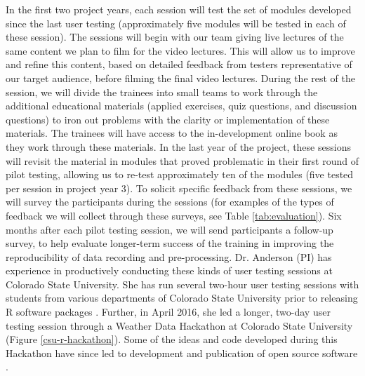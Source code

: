 \documentclass[pdftex,english,11.5pt,parskip=half]{scrartcl}
\begin{document}
In the first two project years, each session will test the set of modules
developed since the last user testing (approximately five modules will be tested
in each of these session). The sessions will begin with our team giving live
lectures of the same content we plan to film for the video lectures. This will allow us to improve and refine this content, based on
detailed feedback from testers representative of our target audience, before
filming the final video lectures. During the rest of the session, we will divide
the trainees into small teams to work through the additional educational
materials (applied exercises, quiz questions, and discussion questions) to iron
out problems with the clarity or implementation of these materials. The trainees
will have access to the in-development online book as they work through these
materials. In the last year of the project, these sessions will revisit the material
in modules that proved problematic in their first round of pilot testing, allowing us
to re-test approximately ten of the modules (five tested per session in project year 3).
To solicit specific feedback from these sessions, we will survey the participants during the sessions (for examples of the types of feedback we will collect through these surveys, see Table \ref*{tab:evaluation}). Six months after each pilot testing session, we will send participants a follow-up survey, to help evaluate longer-term success of the training in improving the reproducibility of data recording and pre-processing. Dr. Anderson (PI) has experience in productively conducting these kinds of user
testing sessions at Colorado State University. She has run several two-hour user testing sessions with
students from various departments of Colorado State University prior to
releasing R software packages \cite{futureheatwaves, countyweather}. Further, in
April 2016, she led a longer, two-day user testing session through a Weather
Data Hackathon at Colorado State University (Figure \ref*{csu-r-hackathon}).
Some of the ideas and code developed during this Hackathon have
since led to development and publication of open source software
\cite{countyfloods, noaastormevents}.
\end{document}

